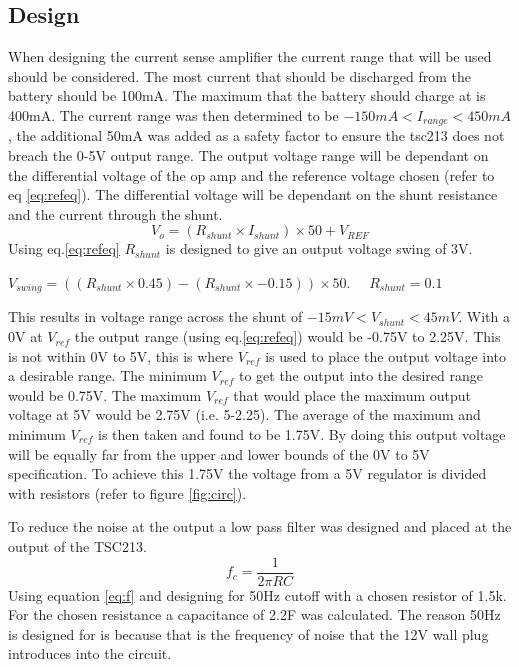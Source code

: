 \subsection{Design}
When designing the current sense amplifier the current range that will be used should be considered. The most current that should be discharged from the battery should be 100mA. The maximum that the battery should charge at is 400mA. The current range was then determined to be $-150mA<I_{range}<450mA$, the additional 50mA was added as a safety factor to ensure the tsc213 does not breach the 0-5V output range. The output voltage range will be dependant on the differential voltage of the op amp and the reference voltage chosen (refer to eq \ref{eq:refeq}). The differential voltage will be dependant on the shunt resistance and the current through the shunt.
\begin{equation}
    V_o=(R_{shunt}\times I_{shunt})\times50+V_{REF}
    \label{eq:refeq}
\end{equation}
Using eq.\ref{eq:refeq} $R_{shunt}$ is designed to give an output voltage swing of 3V.
\begin{center}
    $V_{swing}=((R_{shunt}\times 0.45)-(R_{shunt}\times -0.15))\times 50$. \ \ $R_{shunt}=0.1$\textohm 
\end{center}
This results in voltage range across the shunt of $-15mV<V_{shunt}<45mV$. With a 0V at $V_{ref}$ the output range (using eq.\ref{eq:refeq}) would be -0.75V to 2.25V. This is not within 0V to 5V, this is where $V_{ref}$ is used to place the output voltage into a desirable range. The minimum $V_{ref}$ to get the output into the desired range would be 0.75V. The maximum $V_{ref}$ that would place the maximum output voltage at 5V would be 2.75V (i.e. 5-2.25). The average of the maximum and minimum $V_{ref}$ is then taken and found to be 1.75V. By doing this output voltage will be equally far from the upper and lower bounds of the 0V to 5V specification. To achieve this 1.75V the voltage from a 5V regulator is divided with resistors (refer to figure \ref{fig:circ}). \newline

To reduce the noise at the output a low pass filter was designed and placed at the output of the TSC213. 
\begin{equation}
    f_c=\frac{1}{2\pi RC}
    \label{eq:f}
\end{equation}
Using equation \ref{eq:f} and designing for 50Hz cutoff with a chosen resistor of 1.5k\textohm  \cite{lowpass}. For the chosen resistance a capacitance of 2.2\textmicro F was calculated. The reason 50Hz is designed for is because that is the frequency of noise that the 12V wall plug introduces into the circuit. 

